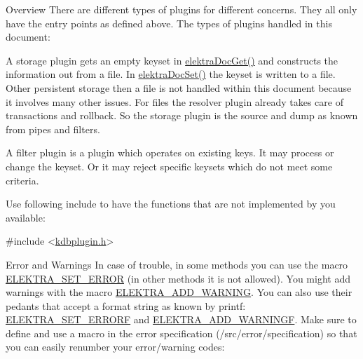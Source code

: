 \begin{DoxyParagraph}{Overview}
There are different types of plugins for different concerns. They all only have the entry points as defined above. The types of plugins handled in this document\+:
\begin{DoxyItemize}
\item A storage plugin gets an empty keyset in \hyperlink{group__plugin_gacb69f3441c6d84241b4362f958fbe313}{elektra\+Doc\+Get()} and constructs the information out from a file. In \hyperlink{group__plugin_gae65781a1deb34efc79c8cb9d9174842c}{elektra\+Doc\+Set()} the keyset is written to a file. ~\newline
 Other persistent storage then a file is not handled within this document because it involves many other issues. For files the resolver plugin already takes care of transactions and rollback. So the storage plugin is the source and dump as known from pipes and filters.
\item A filter plugin is a plugin which operates on existing keys. It may process or change the keyset. Or it may reject specific keysets which do not meet some criteria.
\end{DoxyItemize}
\end{DoxyParagraph}
Use following include to have the functions that are not implemented by you available\+:


\begin{DoxyCodeInclude}
\textcolor{preprocessor}{#include <\hyperlink{kdbplugin_8h}{kdbplugin.h}>}
\end{DoxyCodeInclude}
 \begin{DoxyParagraph}{Error and Warnings}
In case of trouble, in some methods you can use the macro \hyperlink{group__plugin_gaab1842b82272e6d4235b6a71587a64d9}{E\+L\+E\+K\+T\+R\+A\+\_\+\+S\+E\+T\+\_\+\+E\+R\+R\+OR} (in other methods it is not allowed). You might add warnings with the macro \hyperlink{group__plugin_ga3da3bdb0f41710adda9eee3d7adac9ff}{E\+L\+E\+K\+T\+R\+A\+\_\+\+A\+D\+D\+\_\+\+W\+A\+R\+N\+I\+NG}. You can also use their pedants that accept a format string as known by printf\+: \hyperlink{group__plugin_ga3e4fc2c20d8e64bed7a54bb1af882e34}{E\+L\+E\+K\+T\+R\+A\+\_\+\+S\+E\+T\+\_\+\+E\+R\+R\+O\+RF} and \hyperlink{group__plugin_ga2bbb3bc3a3bdaf5b34b52de81886a098}{E\+L\+E\+K\+T\+R\+A\+\_\+\+A\+D\+D\+\_\+\+W\+A\+R\+N\+I\+N\+GF}. Make sure to define and use a macro in the error specification (/src/error/specification) so that you can easily renumber your error/warning codes\+:
\end{DoxyParagraph}

